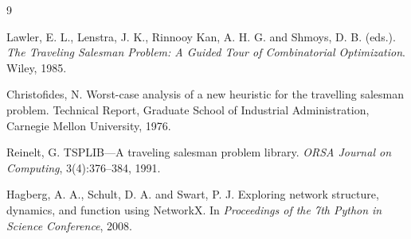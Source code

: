 \documentclass[12pt]{article}
\begin{document}
\begin{thebibliography}{9}

Lawler, E. L., Lenstra, J. K., Rinnooy Kan, A. H. G. and Shmoys, D. B. (eds.).
\newblock \textit{The Traveling Salesman Problem: A Guided Tour of Combinatorial Optimization}.
\newblock Wiley, 1985.

Christofides, N.
\newblock Worst-case analysis of a new heuristic for the travelling salesman problem.
\newblock Technical Report, Graduate School of Industrial Administration, Carnegie Mellon University, 1976.

Reinelt, G.
\newblock TSPLIB---A traveling salesman problem library.
\newblock \textit{ORSA Journal on Computing}, 3(4):376--384, 1991.

Hagberg, A. A., Schult, D. A. and Swart, P. J.
\newblock Exploring network structure, dynamics, and function using NetworkX.
\newblock In \textit{Proceedings of the 7th Python in Science Conference}, 2008.

\end{thebibliography}
\end{document}

